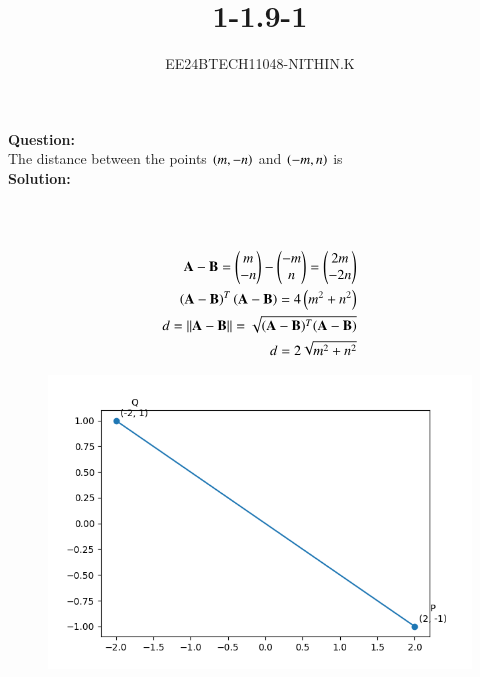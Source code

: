 \documentclass[journal]{IEEEtran}
\begin{document}


\title{1-1.9-1}
\author{EE24BTECH11048-NITHIN.K}
{\let\newpage\relax\maketitle}

\textbf{Question:} \\
The distance between the points $\left(m, -n\right)$ and $\left(-m, n\right)$ is \\
\textbf{Solution:} \\
\begin{table}[h!]
      \centering
      
      \caption{}
\end{table} \\
 \\
\begin{align}
	\mathbf{A} - \mathbf{B}=\begin{pmatrix}
		m \\
		-n\end{pmatrix} - \begin{pmatrix}
		-m \\
		n\end{pmatrix} = \begin{pmatrix}
		2m \\
		-2n\end{pmatrix} \\
	\left(\mathbf{A} - \mathbf{B}\right)^T\left(\mathbf{A} - \mathbf{B}\right) = 4\left(m^2+n^2\right) \\
	d=||\mathbf{A} - \mathbf{B}||=\sqrt{(\mathbf{A} - \mathbf{B})^T(\mathbf{A} - \mathbf{B})} \\
	d=2\sqrt{m^2+n^2}
\end{align}
\begin{figure}[h]
\centering
\includegraphics[width=0.7\linewidth]{figs/Figure_1.png}
\caption{}
\label{graph}
\end{figure}
\end{document}
